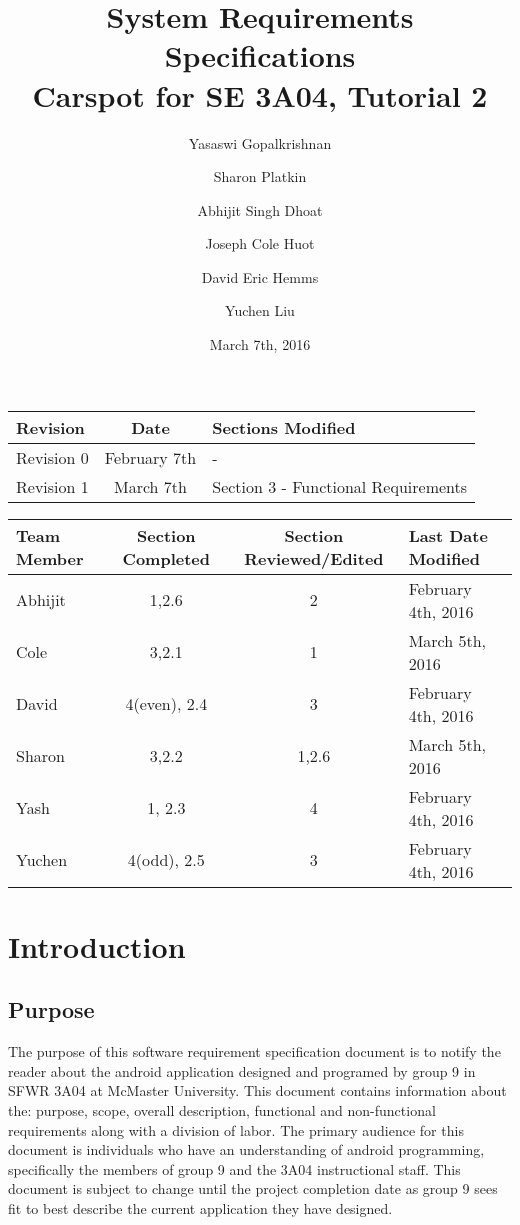 \documentclass[12pt]{article}
\title{System Requirements Specifications\\
	\large Carspot for SE 3A04, Tutorial 2}
\author{
         Yasaswi Gopalkrishnan\\ \newline
         \and
         Sharon Platkin \\ \newline
         \and 
         Abhijit Singh Dhoat\\ \newline
         \and
         Joseph Cole Huot\\ \newline
         \and
         David Eric Hemms\\ \newline
         \and 
         Yuchen Liu\\ \newline
    }
\date{March 7th, 2016}
\begin{document}
\maketitle
\newpage
\tableofcontents
\listoftables
\newpage


\begin{table}[h!]
\caption{Revision History}
\begin{longtable}{ | l | c | p{4cm} |}
	\hline	
	Revision & Date & Sections Modified\\ \hline
	Revision 0 & February 7th & - \\ \hline
	Revision 1 & March 7th & Section 3 - Functional Requirements \\ \hline
\end{longtable}
\end{table}

\begin{table}[h!]
\caption{Work Division}
\begin{longtable}{ | l | c | c | p{4cm} |}
	\hline
	Team Member & Section Completed & Section Reviewed/Edited & Last Date Modified \\ \hline
	Abhijit & 1,2.6 & 2 & February 4th, 2016\\ \hline
	Cole & 3,2.1 & 1 & March 5th, 2016\\ \hline
	David & 4(even), 2.4 & 3 & February 4th, 2016\\ \hline
	Sharon & 3,2.2 & 1,2.6 & March 5th, 2016\\ \hline
	Yash & 1, 2.3 & 4 & February 4th, 2016\\ \hline
	Yuchen & 4(odd), 2.5 & 3 & February 4th, 2016\\ \hline
\end{longtable}
\end{table}

\newpage

\section{Introduction}
\subsection{Purpose}
The purpose of this software requirement specification document is to notify the reader about the android application designed and programed by group 9 in SFWR 3A04 at McMaster University. This document contains information about the: purpose, scope, overall description, functional and non-functional requirements along with a division of labor. The primary audience for this document is individuals who have an understanding of android programming, specifically the members of group 9 and the 3A04 instructional staff. This document is subject to change until the project completion date as group 9 sees fit to best describe the current application they have designed.
\end{document}
